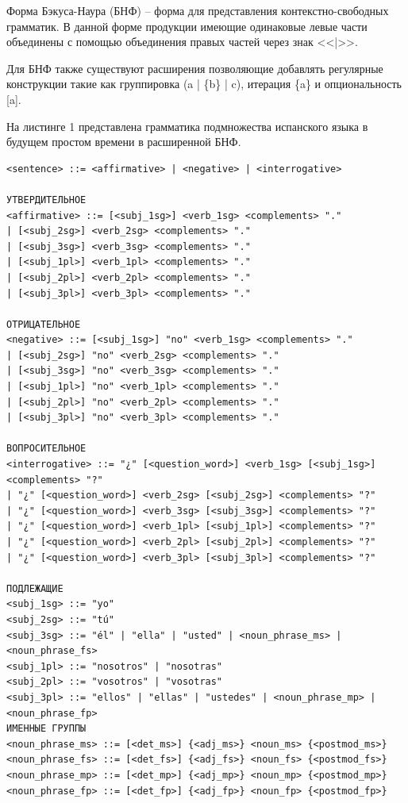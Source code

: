 \documentclass[a4paper,final]{article}
\begin{document}
Форма Бэкуса-Наура (БНФ) -- форма для представления контекстно-свободных грамматик. В данной форме продукции имеющие одинаковые левые части объединены с помощью объединения правых частей через знак <<|>>.

Для БНФ также существуют расширения позволяющие добавлять регулярные конструкции такие как группировка (a | \{b\} | c), итерация \{a\} и опциональность [a].

На листинге 1 представлена грамматика подмножества испанского языка в будущем простом времени в расширенной БНФ.\\[3em]

\footnotesize{
\begin{lstlisting}[caption = {Грамматика подмножества языка в БНФ}]
<sentence> ::= <affirmative> | <negative> | <interrogative>

УТВЕРДИТЕЛЬНОЕ
<affirmative> ::= [<subj_1sg>] <verb_1sg> <complements> "."
| [<subj_2sg>] <verb_2sg> <complements> "."
| [<subj_3sg>] <verb_3sg> <complements> "."
| [<subj_1pl>] <verb_1pl> <complements> "."
| [<subj_2pl>] <verb_2pl> <complements> "."
| [<subj_3pl>] <verb_3pl> <complements> "."

ОТРИЦАТЕЛЬНОЕ
<negative> ::= [<subj_1sg>] "no" <verb_1sg> <complements> "."
| [<subj_2sg>] "no" <verb_2sg> <complements> "."
| [<subj_3sg>] "no" <verb_3sg> <complements> "."
| [<subj_1pl>] "no" <verb_1pl> <complements> "."
| [<subj_2pl>] "no" <verb_2pl> <complements> "."
| [<subj_3pl>] "no" <verb_3pl> <complements> "."

ВОПРОСИТЕЛЬНОЕ
<interrogative> ::= "¿" [<question_word>] <verb_1sg> [<subj_1sg>] <complements> "?"
| "¿" [<question_word>] <verb_2sg> [<subj_2sg>] <complements> "?"
| "¿" [<question_word>] <verb_3sg> [<subj_3sg>] <complements> "?"
| "¿" [<question_word>] <verb_1pl> [<subj_1pl>] <complements> "?"
| "¿" [<question_word>] <verb_2pl> [<subj_2pl>] <complements> "?"
| "¿" [<question_word>] <verb_3pl> [<subj_3pl>] <complements> "?"

ПОДЛЕЖАЩИЕ
<subj_1sg> ::= "yo"
<subj_2sg> ::= "tú"
<subj_3sg> ::= "él" | "ella" | "usted" | <noun_phrase_ms> | <noun_phrase_fs>
<subj_1pl> ::= "nosotros" | "nosotras"
<subj_2pl> ::= "vosotros" | "vosotras"
<subj_3pl> ::= "ellos" | "ellas" | "ustedes" | <noun_phrase_mp> | <noun_phrase_fp>
ИМЕННЫЕ ГРУППЫ
<noun_phrase_ms> ::= [<det_ms>] {<adj_ms>} <noun_ms> {<postmod_ms>}
<noun_phrase_fs> ::= [<det_fs>] {<adj_fs>} <noun_fs> {<postmod_fs>}
<noun_phrase_mp> ::= [<det_mp>] {<adj_mp>} <noun_mp> {<postmod_mp>}
<noun_phrase_fp> ::= [<det_fp>] {<adj_fp>} <noun_fp> {<postmod_fp>}


\end{lstlisting}}
\end{document}
